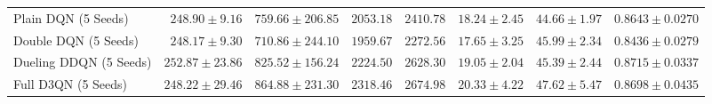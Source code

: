 \documentclass[12pt,a4paper,oneside]{report}
\begin{document}
\begin{table}[htbp]
{\begin{tabular}{lrrrrrrr}
Plain DQN (5 Seeds) & $248.90 \pm 9.16$ & $759.66 \pm 206.85$ & $2053.18$ & $2410.78$ & $18.24 \pm 2.45$ & $44.66 \pm 1.97$ & $0.8643 \pm 0.0270$\\
Double DQN (5 Seeds) & $248.17 \pm 9.30$ & $\mathbf{710.86 \pm 244.10}$ & $\mathbf{1959.67}$ & $\mathbf{2272.56}$ & $\mathbf{17.65 \pm 3.25}$ & $45.99 \pm 2.34$ & $0.8436 \pm 0.0279$\\
Dueling DDQN (5 Seeds) & $252.87 \pm 23.86$ & $825.52 \pm 156.24$ & $2224.50$ & $2628.30$ & $19.05 \pm 2.04$ & $\mathbf{45.39 \pm 2.44}$ & $\mathbf{0.8715 \pm 0.0337}$\\
Full D3QN (5 Seeds) & $\mathbf{248.22 \pm 29.46}$ & $864.88 \pm 231.30$ & $2318.46$ & $2674.98$ & $20.33 \pm 4.22$ & $47.62 \pm 5.47$ & $0.8698 \pm 0.0435$\\
\bottomrule
\end{tabular}}
\end{table}

\begin{table}[htbp]
\centering
\small
\caption{Three-Way Hierarchical Cluster Bootstrap Paired Component Isolation Across 500 Evaluations (Clustering over Training Seed, Workload Seed, and Topology; 10,000 Iterations; 95\% CIs).}
\label{tab:ablation_bootstrap}
\end{table}
\end{document}
